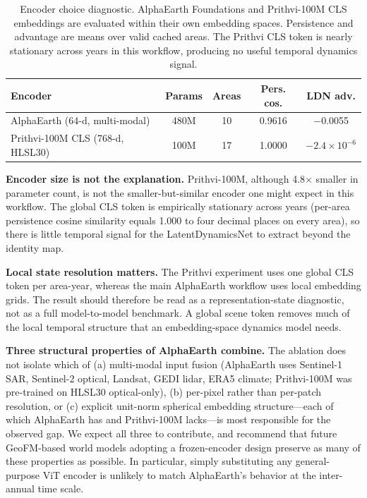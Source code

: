 \documentclass{article}
\begin{document}
\begin{table}[htbp]
\centering
\caption{Encoder choice diagnostic. AlphaEarth Foundations and Prithvi-100M CLS embeddings are evaluated within their own embedding spaces. Persistence and advantage are means over valid cached areas. The Prithvi CLS token is nearly stationary across years in this workflow, producing no useful temporal dynamics signal.}
\label{tab:encoder_ablation}
\small
\begin{tabular*}{\textwidth}{@{\extracolsep{\fill}}lcccc@{}}
\toprule
Encoder & Params & Areas & Pers. cos. & LDN adv. \\
\midrule
AlphaEarth (64-d, multi-modal) & 480M & 10 & 0.9616 & $-$0.0055 \\
Prithvi-100M CLS (768-d, HLSL30) & 100M & 17 & 1.0000 & $-2.4 \times 10^{-6}$ \\
\bottomrule
\end{tabular*}
\end{table}

\textbf{Encoder size is not the explanation.} Prithvi-100M, although 4.8$\times$ smaller in parameter count, is not the smaller-but-similar encoder one might expect in this workflow. The global CLS token is empirically stationary across years (per-area persistence cosine similarity equals 1.000 to four decimal places on every area), so there is little temporal signal for the LatentDynamicsNet to extract beyond the identity map.

\textbf{Local state resolution matters.} The Prithvi experiment uses one global CLS token per area-year, whereas the main AlphaEarth workflow uses local embedding grids. The result should therefore be read as a representation-state diagnostic, not as a full model-to-model benchmark. A global scene token removes much of the local temporal structure that an embedding-space dynamics model needs.

\textbf{Three structural properties of AlphaEarth combine.} The ablation does not isolate which of (a) multi-modal input fusion (AlphaEarth uses Sentinel-1 SAR, Sentinel-2 optical, Landsat, GEDI lidar, ERA5 climate; Prithvi-100M was pre-trained on HLSL30 optical-only), (b) per-pixel rather than per-patch resolution, or (c) explicit unit-norm spherical embedding structure---each of which AlphaEarth has and Prithvi-100M lacks---is most responsible for the observed gap. We expect all three to contribute, and recommend that future GeoFM-based world models adopting a frozen-encoder design preserve as many of these properties as possible. In particular, simply substituting any general-purpose ViT encoder is unlikely to match AlphaEarth's behavior at the inter-annual time scale.
\end{document}
